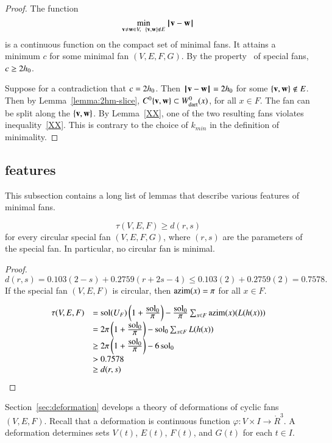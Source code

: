 \begin{proof} The function
$$
\min_{{\mathbf v}\ne {\mathbf w}\in V,~~\{{\mathbf v},{\mathbf w}\}\not\in E} {\hskip0.1em|\hskip-0.15em|\hskip0.1em}{\mathbf v} - {\mathbf w}{\hskip0.1em|\hskip-0.15em|\hskip0.1em}
$$
is a continuous function on the compact set of minimal fans.
It attains a minimum $c$ for some minimal fan $(V,E,F,G)$.  By the property~ of special fans, $c\ge 2{h_0}$.

Suppose for a contradiction that $c=2{h_0}$.  Then ${\hskip0.1em|\hskip-0.15em|\hskip0.1em}{\mathbf v} - {\mathbf w}{\hskip0.1em|\hskip-0.15em|\hskip0.1em}=2{h_0}$ for
some $\{{\mathbf v},{\mathbf w}\}\not\in E$.  Then by Lemma~\ref{lemma:2hm-slice}, $C^0\{{\mathbf v},{\mathbf w}\}\subset W^0_{\text{dart}}(x)$, for all $x\in F$.
The fan can be split along the $\{{\mathbf v},{\mathbf w}\}$.  By Lemma~\ref{XX}, one of the two resulting fans violates inequality~\ref{XX}.  This is contrary to the choice of $k_{min}$ in the definition of minimality.
\end{proof}

\subsection{features}

This subsection contains a long list of lemmas that describe various features of minimal fans.

\begin{lemma}
$$
\tau(V,E,F) \ge d (r,s)
$$
for every circular special fan $(V,E,F,G)$,
where $(r,s)$ are the parameters of the special fan.  In particular, no
circular fan is minimal.
\end{lemma}

\begin{proof}
$$d(r,s) =0.103 (2-s) + 0.2759 (r+2s-4) \le 0.103 (2) + 0.2759 (2) =0.7578.$$
If the special fan $(V,E,F)$ is circular, then ${\operatorname{azim}}(x) =\pi$ for all $x\in F$.

$$
\begin{array}{lll}
\tau(V,E,F) &= \operatorname{sol}(U_F) \left( 1 + \frac{\displaystyle \operatorname{sol}_0}{\displaystyle \pi}\right) - \frac{\displaystyle \operatorname{sol}_0}{\displaystyle \pi} \sum_{x\in F} {\operatorname{azim}}(x)(L(h(x)))\\
&= 2\pi \left( 1 + \frac{\displaystyle \operatorname{sol}_0}{\displaystyle \pi}\right) - \operatorname{sol}_0 \sum_{x\in F} L(h(x))\\
&\ge 2\pi \left( 1 + \frac{\displaystyle \operatorname{sol}_0}{\displaystyle \pi}\right) - 6 \operatorname{sol}_0\\
&> 0.7578\\ 
&\ge d(r,s)\\
\end{array}
$$
\end{proof}


Section~\ref{sec:deformation} develops a theory of deformations of cyclic fans $(V,E,F)$.  Recall that a deformation is  continuous function $\varphi:V\times I\to\ring{R}^3$.  A deformation determines sets $V(t)$, $E(t)$, $F(t)$, and $G(t)$ for each $t\in I$.

